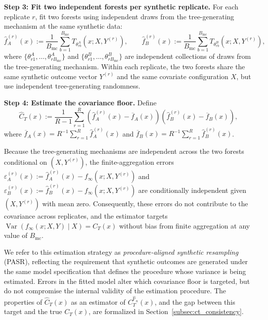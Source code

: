 \documentclass[11pt]{article}
\theoremstyle{plain}
\theoremstyle{definition}
\theoremstyle{remark}
\DeclareMathOperator{\Var}{Var}
\begin{document}
\medskip
\noindent\textbf{Step 3: Fit two independent forests per synthetic replicate.}
For each replicate $r$, fit two forests using independent draws from the tree-generating mechanism at the same synthetic data:
\[
\widehat f_{A}^{(r)}(x)
:=
\frac{1}{B_{\mathrm{mc}}}
\sum_{b=1}^{B_{\mathrm{mc}}}
T_{\theta_{rb}^A}\!\left(x;X,Y^{(r)}\right),
\qquad
\widehat f_{B}^{(r)}(x)
:=
\frac{1}{B_{\mathrm{mc}}}
\sum_{b=1}^{B_{\mathrm{mc}}}
T_{\theta_{rb}^B}\!\left(x;X,Y^{(r)}\right),
\]
where $\{\theta_{r1}^A,\ldots,\theta_{rB_{\mathrm{mc}}}^A\}$ and $\{\theta_{r1}^B,\ldots,\theta_{rB_{\mathrm{mc}}}^B\}$ are independent collections of draws from the tree-generating mechanism. Within each replicate, the two forests share the same synthetic outcome vector $Y^{(r)}$ and the same covariate configuration $X$, but use independent tree-generating randomness.

\medskip
\noindent\textbf{Step 4: Estimate the covariance floor.}
Define
\begin{equation}
	\label{eq:ct_hat}
	\widehat C_T(x)
	:=
	\frac{1}{R-1}
	\sum_{r=1}^R
	\left(
	\widehat f_{A}^{(r)}(x)
	-
	\overline f_{A}(x)
	\right)
	\left(
	\widehat f_{B}^{(r)}(x)
	-
	\overline f_{B}(x)
	\right),
\end{equation}
where $\overline f_{A}(x)=R^{-1}\sum_{r=1}^R\widehat f_{A}^{(r)}(x)$ and $\overline f_{B}(x)=R^{-1}\sum_{r=1}^R\widehat f_{B}^{(r)}(x)$.

Because the tree-generating mechanisms are independent across the two forests conditional on $(X,Y^{(r)})$, the finite-aggregation errors $\varepsilon_A^{(r)}(x) := \widehat f_{A}^{(r)}(x) - f_\infty(x;X,Y^{(r)})$ and $\varepsilon_B^{(r)}(x) := \widehat f_{B}^{(r)}(x) - f_\infty(x;X,Y^{(r)})$ are conditionally independent given $(X,Y^{(r)})$ with mean zero. Consequently, these errors do not contribute to the covariance across replicates, and the estimator targets $\Var(f_\infty(x;X,Y)\mid X) = C_T(x)$ without bias from finite aggregation at any value of $B_{\mathrm{mc}}$.

We refer to this estimation strategy as \emph{procedure-aligned synthetic resampling} (PASR), reflecting the requirement that synthetic outcomes are generated under the same model specification that defines the procedure whose variance is being estimated. Errors in the fitted model alter which covariance floor is targeted, but do not compromise the internal validity of the estimation procedure. The properties of $\widehat C_T(x)$ as an estimator of $C_T^{\widehat{\mathbb P}_n}(x)$, and the gap between this target and the true $C_T(x)$, are formalized in Section~\ref{subsec:ct_consistency}.
\end{document}
